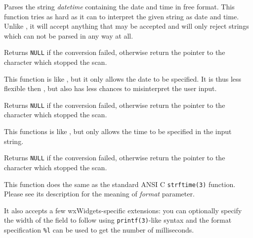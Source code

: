 \label{wxdatetimeparsedatetime}


Parses the string {\it datetime} containing the date and time in free format.
This function tries as hard as it can to interpret the given string as date
and time. Unlike , it
will accept anything that may be accepted and will only reject strings which
can not be parsed in any way at all.

Returns {\tt NULL} if the conversion failed, otherwise return the pointer to
the character which stopped the scan.


\label{wxdatetimeparsedate}


This function is like , but it
only allows the date to be specified. It is thus less flexible then
, but also has less chances to
misinterpret the user input.

Returns {\tt NULL} if the conversion failed, otherwise return the pointer to
the character which stopped the scan.


\label{wxdatetimeparsetime}


This functions is like , but
only allows the time to be specified in the input string.

Returns {\tt NULL} if the conversion failed, otherwise return the pointer to
the character which stopped the scan.


\label{wxdatetimeformat}


This function does the same as the standard ANSI C {\tt strftime(3)} function.
Please see its description for the meaning of {\it format} parameter.

It also accepts a few wxWidgets-specific extensions: you can optionally specify
the width of the field to follow using {\tt printf(3)}-like syntax and the
format specification {\tt \%l} can be used to get the number of milliseconds.

